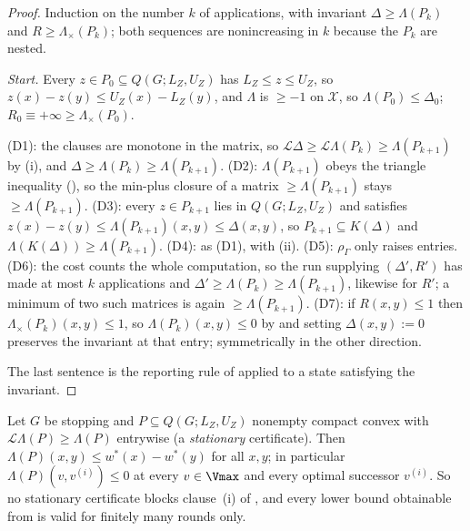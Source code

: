 \begin{proof}
Induction on the number $k$ of applications, with invariant
$\Delta\ge\Lambda(P_k)$ and $R\ge\Lambda_{\times}(P_k)$; both sequences
are nonincreasing in $k$ because the $P_k$ are nested.

\emph{Start.} Every $z\in P_0\subseteq Q(G;L_Z,U_Z)$ has
$L_Z\le z\le U_Z$, so $z(x)-z(y)\le U_Z(x)-L_Z(y)$, and $\Lambda$ is
$\ge-1$ on $\mathcal X$, so $\Lambda(P_0)\le\Delta_0$;
$R_0\equiv+\infty\ge\Lambda_\times(P_0)$.

\textup{(D1)}: the clauses are monotone in the matrix, so
$\mathcal L\Delta\ge\mathcal L\Lambda(P_k)\ge\Lambda(P_{k+1})$ by (i), and
$\Delta\ge\Lambda(P_k)\ge\Lambda(P_{k+1})$.
\textup{(D2)}: $\Lambda(P_{k+1})$ obeys the triangle inequality
(), so the min-plus closure of a matrix
$\ge\Lambda(P_{k+1})$ stays $\ge\Lambda(P_{k+1})$.
\textup{(D3)}: every $z\in P_{k+1}$ lies in $Q(G;L_Z,U_Z)$ and satisfies
$z(x)-z(y)\le\Lambda(P_{k+1})(x,y)\le\Delta(x,y)$, so
$P_{k+1}\subseteq K(\Delta)$ and $\Lambda(K(\Delta))\ge\Lambda(P_{k+1})$.
\textup{(D4)}: as \textup{(D1)}, with (ii).
\textup{(D5)}: $\rho_\Gamma$ only raises entries.
\textup{(D6)}: the cost counts the whole computation, so the run
supplying $(\Delta',R')$ has made at most $k$ applications and
$\Delta'\ge\Lambda(P_k)\ge\Lambda(P_{k+1})$, likewise for $R'$; a minimum
of two such matrices is again $\ge\Lambda(P_{k+1})$.
\textup{(D7)}: if $R(x,y)\le1$ then $\Lambda_\times(P_k)(x,y)\le1$, so
$\Lambda(P_k)(x,y)\le0$ by  and setting $\Delta(x,y):=0$
preserves the invariant at that entry; symmetrically in the other
direction.

The last sentence is the reporting rule of  applied to a
state satisfying the invariant.
\end{proof}

\begin{proposition}\label{ob:no-permanent}
Let $G$ be stopping and $P\subseteq Q(G;L_Z,U_Z)$ nonempty compact convex
with $\mathcal L\Lambda(P)\ge\Lambda(P)$ entrywise (a \emph{stationary}
certificate). Then $\Lambda(P)(x,y)\le w^\ast(x)-w^\ast(y)$ for all
$x,y$; in particular $\Lambda(P)(v,v^{(i)})\le0$ at every $v\in\Vmax$ and
every optimal successor $v^{(i)}$. So no stationary certificate blocks
clause~(i) of , and every lower bound obtainable
from  is valid for finitely many rounds only.
\end{proposition}

